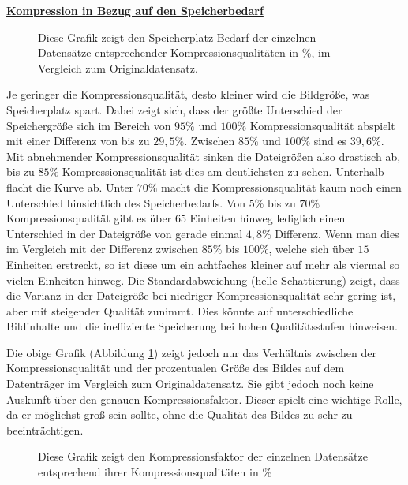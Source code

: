 \newpage 
            \underline{\textbf{Kompression in Bezug auf den Speicherbedarf}}        
            \begin{figure}[!htb]
                \centering
                
                \caption{Diese Grafik zeigt den Speicherplatz Bedarf der einzelnen Datensätze entsprechender Kompressionsqualitäten in $\%$, im Vergleich zum Originaldatensatz.}
                \label{fig:speicher_kompressionsqualität}
            \end{figure}

            Je geringer die Kompressionsqualität, desto kleiner wird die Bildgröße, was Speicherplatz spart. Dabei zeigt sich, dass der größte Unterschied der Speichergröße sich im Bereich von $95\%$ und $100\%$ Kompressionsqualität abspielt mit einer Differenz von bis zu $29,5\%$. Zwischen $85\%$ und $100\%$ sind es $39,6\%$. Mit abnehmender Kompressionsqualität sinken die Dateigrößen also drastisch ab, bis zu $85\%$ Kompressionsqualität ist dies am deutlichsten zu sehen. Unterhalb flacht die Kurve ab. Unter $70\%$ macht die Kompressionsqualität kaum noch einen Unterschied hinsichtlich des Speicherbedarfs.
            Von $5\%$ bis zu $70\%$ Kompressionsqualität gibt es über $65$ Einheiten hinweg lediglich einen Unterschied in der Dateigröße von gerade einmal $4,8\%$ Differenz. Wenn man dies im Vergleich mit der Differenz zwischen $85\%$ bis $100\%$, welche sich über $15$ Einheiten erstreckt, so ist diese um ein achtfaches kleiner auf mehr als viermal so vielen Einheiten hinweg. Die Standardabweichung (helle Schattierung) zeigt, dass die Varianz in der Dateigröße bei niedriger Kompressionsqualität sehr gering ist, aber mit steigender Qualität zunimmt. Dies könnte auf unterschiedliche Bildinhalte und die ineffiziente Speicherung bei hohen Qualitätsstufen hinweisen.

\newpage
            Die obige Grafik (Abbildung \ref{fig:speicher_kompressionsqualität}) zeigt jedoch nur das Verhältnis zwischen der Kompressionsqualität und der prozentualen Größe des Bildes auf dem Datenträger im Vergleich zum Originaldatensatz. Sie gibt jedoch noch keine Auskunft über den genauen Kompressionsfaktor. Dieser spielt eine wichtige Rolle, da er möglichst groß sein sollte, ohne die Qualität des Bildes zu sehr zu beeinträchtigen.
            
            \begin{figure}[!htb]
                \centering
                
                \caption{Diese Grafik zeigt den Kompressionsfaktor der einzelnen Datensätze entsprechend ihrer
                Kompressionsqualitäten in $\%$}
                \label{fig:speicher_kompressionsfaktor}
            \end{figure}

